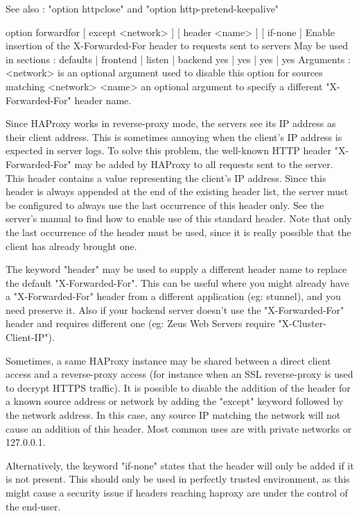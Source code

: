   See also : "option httpclose" and "option http-pretend-keepalive"


option forwardfor [ except <network> ] [ header <name> ] [ if-none ]
  Enable insertion of the X-Forwarded-For header to requests sent to servers
  May be used in sections :   defaults | frontend | listen | backend
                                 yes   |    yes   |   yes  |   yes
  Arguments :
    <network> is an optional argument used to disable this option for sources
              matching <network>
    <name>    an optional argument to specify a different "X-Forwarded-For"
              header name.

  Since HAProxy works in reverse-proxy mode, the servers see its IP address as
  their client address. This is sometimes annoying when the client's IP address
  is expected in server logs. To solve this problem, the well-known HTTP header
  "X-Forwarded-For" may be added by HAProxy to all requests sent to the server.
  This header contains a value representing the client's IP address. Since this
  header is always appended at the end of the existing header list, the server
  must be configured to always use the last occurrence of this header only. See
  the server's manual to find how to enable use of this standard header. Note
  that only the last occurrence of the header must be used, since it is really
  possible that the client has already brought one.

  The keyword "header" may be used to supply a different header name to replace
  the default "X-Forwarded-For". This can be useful where you might already
  have a "X-Forwarded-For" header from a different application (eg: stunnel),
  and you need preserve it. Also if your backend server doesn't use the
  "X-Forwarded-For" header and requires different one (eg: Zeus Web Servers
  require "X-Cluster-Client-IP").

  Sometimes, a same HAProxy instance may be shared between a direct client
  access and a reverse-proxy access (for instance when an SSL reverse-proxy is
  used to decrypt HTTPS traffic). It is possible to disable the addition of the
  header for a known source address or network by adding the "except" keyword
  followed by the network address. In this case, any source IP matching the
  network will not cause an addition of this header. Most common uses are with
  private networks or 127.0.0.1.

  Alternatively, the keyword "if-none" states that the header will only be
  added if it is not present. This should only be used in perfectly trusted
  environment, as this might cause a security issue if headers reaching haproxy
  are under the control of the end-user.

